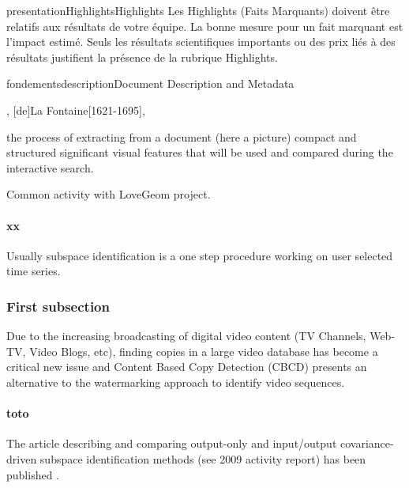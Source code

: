 \documentclass{ra2015}
\begin{document}
\begin{module}{presentation}{Highlights}{Highlights}
Les  Highlights (Faits Marquants) doivent être relatifs aux résultats de votre équipe. La bonne mesure pour un fait marquant est l'impact estimé. Seuls les résultats scientifiques importants ou des prix liés à des résultats justifient la présence de la rubrique Highlights.
\end{module}


\begin{module}{fondements}{description}{Document Description and Metadata}


\begin{participants}
,
[de]{La Fontaine}[1621-1695],
\end{participants}

\begin{glossaire}
 {the process of extracting from a
  document (here a picture) compact and structured significant visual 
  features that will be used and compared during the interactive
  search.}
\end{glossaire}

\begin{moreinfo}
Common activity with LoveGeom project. 
\end{moreinfo}

\paragraph{xx}
Usually subspace identification is a one step procedure working on user selected time series. 

\subsubsection{First subsection}
Due to the increasing broadcasting of digital video content (TV
 Channels, Web-TV, Video Blogs, etc), finding copies in a large video
 database has become a critical new issue and Content Based Copy
 Detection (CBCD) presents an alternative to the watermarking
 approach to identify video sequences.

\paragraph{toto}
The article describing and comparing output-only and input/output covariance-driven subspace 
identification methods (see 2009 activity report) has been published \cite {Mlb-MpdSR}.


\end{module}
\end{document}
